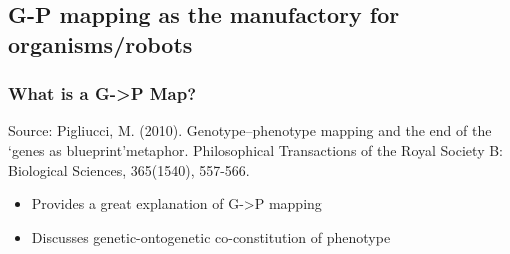 \documentclass[11pt]{article}
\begin{document}
\subsection*{G-P mapping as the manufactory for organisms/robots}
\label{sec:orgheadline12}

\subsubsection*{What is a G->P Map?}
\label{sec:orgheadline6}

Source: Pigliucci, M. (2010). Genotype–phenotype mapping and the end of the ‘genes as blueprint’metaphor. Philosophical Transactions of the Royal Society B: Biological Sciences, 365(1540), 557-566.
\begin{itemize}
\item Provides a great explanation of G->P mapping
\item Discusses genetic-ontogenetic co-constitution of phenotype
\end{itemize}
\end{document}
